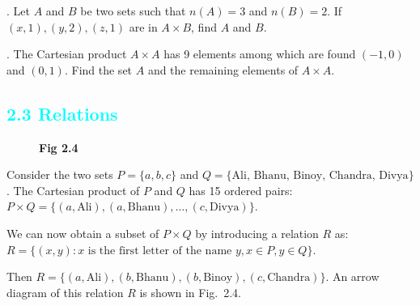 \documentclass[11pt]{article}
\begin{document}
. Let $A$ and $B$ be two sets such that $n(A)=3$ and $n(B)=2$. If $(x, 1), (y, 2), (z, 1)$ are in $A\times B$, find $A$ and $B$.

. The Cartesian product $A \times A$ has 9 elements among which are found $(-1, 0)$ and $(0,1)$. Find the set $A$ and the remaining elements of $A \times A$.
\textcolor{cyan}{\section*{2.3 Relations}}

\begin{figure}
\centering
\vspace{-25pt} 
\caption*{\textbf{Fig 2.4}}
\end{figure}

Consider the two sets $P = \{a, b, c\}$ and $Q = \{\text{Ali, Bhanu, Binoy, Chandra, Divya}\}$. The Cartesian product of $P$ and $Q$ has 15 ordered pairs: $P \times Q = \{(a, \text{Ali}), (a, \text{Bhanu}), \dots, (c, \text{Divya})\}$. 

\vspace{0.5em}
We can now obtain a subset of $P \times Q$ by introducing a relation $R$ as:
$R = \{ (x,y) : x \text{ is the first letter of the name } y, x \in P, y \in Q \}$. 

\vspace{0.5em}

Then $R = \{(a, \text{Ali}), (b, \text{Bhanu}), (b, \text{Binoy}), (c, \text{Chandra})\}$.
An arrow diagram of this relation $R$ is shown in Fig.~2.4.
\end{document}
